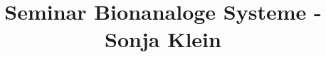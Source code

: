 \documentclass{SeminarV2}
\begin{document}
\title{Seminar Bionanaloge Systeme - Sonja Klein}
\maketitle









\end{document}
